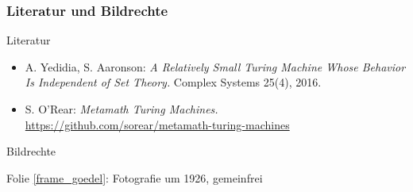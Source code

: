 \documentclass[aspectratio=1610,onlymath]{beamer}
\begin{document}
\begin{frame}[t]\frametitle{Literatur und Bildrechte}

\alert{Literatur}\bigskip

\begin{itemize}
\item A. Yedidia, S. Aaronson: \emph{A Relatively Small Turing Machine Whose Behavior Is Independent of Set Theory.} Complex Systems 25(4), 2016.
\item S. O'Rear: \emph{Metamath Turing Machines.} \url{https://github.com/sorear/metamath-turing-machines}
\end{itemize}

\alert{Bildrechte}\bigskip

Folie \ref{frame_goedel}: Fotografie um 1926, gemeinfrei

\end{frame}
\end{document}

